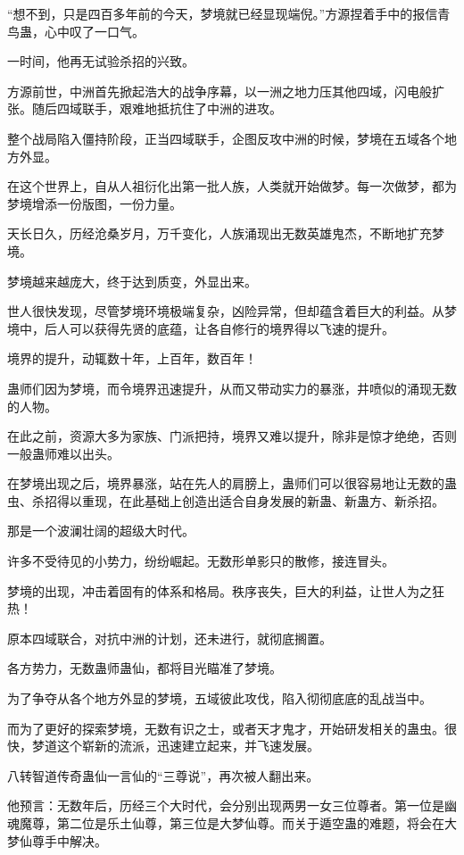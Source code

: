 
\begin{this_body}

“想不到，只是四百多年前的今天，梦境就已经显现端倪。”方源捏着手中的报信青鸟蛊，心中叹了一口气。

一时间，他再无试验杀招的兴致。

方源前世，中洲首先掀起浩大的战争序幕，以一洲之地力压其他四域，闪电般扩张。随后四域联手，艰难地抵抗住了中洲的进攻。

整个战局陷入僵持阶段，正当四域联手，企图反攻中洲的时候，梦境在五域各个地方外显。

在这个世界上，自从人祖衍化出第一批人族，人类就开始做梦。每一次做梦，都为梦境增添一份版图，一份力量。

天长日久，历经沧桑岁月，万千变化，人族涌现出无数英雄鬼杰，不断地扩充梦境。

梦境越来越庞大，终于达到质变，外显出来。

世人很快发现，尽管梦境环境极端复杂，凶险异常，但却蕴含着巨大的利益。从梦境中，后人可以获得先贤的底蕴，让各自修行的境界得以飞速的提升。

境界的提升，动辄数十年，上百年，数百年！

蛊师们因为梦境，而令境界迅速提升，从而又带动实力的暴涨，井喷似的涌现无数的人物。

在此之前，资源大多为家族、门派把持，境界又难以提升，除非是惊才绝绝，否则一般蛊师难以出头。

在梦境出现之后，境界暴涨，站在先人的肩膀上，蛊师们可以很容易地让无数的蛊虫、杀招得以重现，在此基础上创造出适合自身发展的新蛊、新蛊方、新杀招。

那是一个波澜壮阔的超级大时代。

许多不受待见的小势力，纷纷崛起。无数形单影只的散修，接连冒头。

梦境的出现，冲击着固有的体系和格局。秩序丧失，巨大的利益，让世人为之狂热！

原本四域联合，对抗中洲的计划，还未进行，就彻底搁置。

各方势力，无数蛊师蛊仙，都将目光瞄准了梦境。

为了争夺从各个地方外显的梦境，五域彼此攻伐，陷入彻彻底底的乱战当中。

而为了更好的探索梦境，无数有识之士，或者天才鬼才，开始研发相关的蛊虫。很快，梦道这个崭新的流派，迅速建立起来，并飞速发展。

八转智道传奇蛊仙一言仙的“三尊说”，再次被人翻出来。

他预言：无数年后，历经三个大时代，会分别出现两男一女三位尊者。第一位是幽魂魔尊，第二位是乐土仙尊，第三位是大梦仙尊。而关于遁空蛊的难题，将会在大梦仙尊手中解决。


\end{this_body}
